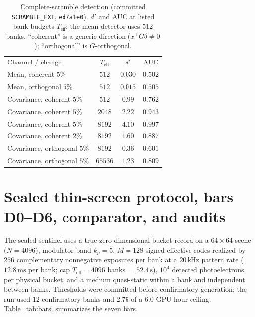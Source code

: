 \documentclass[aps,prl,onecolumn,notitlepage,nofootinbib,superscriptaddress]{revtex4-2}
\begin{document}
\begin{table}[h]
\centering
\caption{Complete-scramble detection (committed \texttt{SCRAMBLE\_EXT},
\texttt{ed7a1e0}). $d'$ and AUC at listed bank budgets $T_{\mathrm{eff}}$; the
mean detector uses $512$ banks. ``coherent'' is a generic direction
($x^{\!\top}G\delta\neq0$); ``orthogonal'' is $G$-orthogonal.}
\label{tab:duel}
\begin{ruledtabular}
\begin{tabular}{lccc}
Channel / change & $T_{\mathrm{eff}}$ & $d'$ & AUC\\
\colrule
Mean, coherent $5\%$        & $512$   & $0.030$ & $0.502$\\
Mean, orthogonal $5\%$      & $512$   & $0.015$ & $0.505$\\
Covariance, coherent $5\%$  & $512$   & $0.99$  & $0.762$\\
Covariance, coherent $5\%$  & $2048$  & $2.22$  & $0.943$\\
Covariance, coherent $5\%$  & $8192$  & $4.10$  & $0.997$\\
Covariance, coherent $2\%$  & $8192$  & $1.60$  & $0.887$\\
Covariance, orthogonal $5\%$& $8192$  & $0.36$  & $0.601$\\
Covariance, orthogonal $5\%$& $65536$ & $1.23$  & $0.809$\\
\end{tabular}
\end{ruledtabular}
\end{table}

\section{Sealed thin-screen protocol, bars D0--D6, comparator, and audits}
The sealed sentinel uses a true zero-dimensional bucket record on a $64\times64$
scene ($N=4096$), modulator band $k_p=5$, $M=128$ signed effective codes realized
by $256$ complementary nonnegative exposures per bank at a $20\,\mathrm{kHz}$
pattern rate ($12.8\,\mathrm{ms}$ per bank; cap $T_{\mathrm{eff}}=4096$ banks
$=52.4\,\mathrm{s}$), $10^4$ detected photoelectrons per physical bucket, and a
medium quasi-static within a bank and independent between banks. Thresholds were
committed before confirmatory generation; the run used $12$ confirmatory banks and
$2.76$ of a $6.0$ GPU-hour ceiling. Table~\ref{tab:bars} summarizes the seven
bars.
\end{document}

